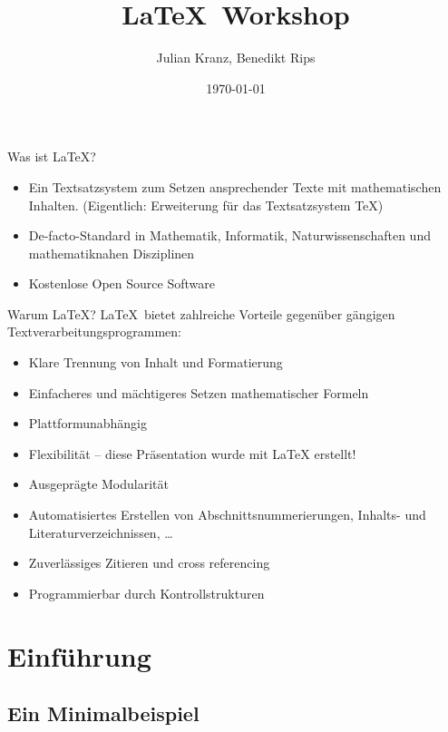 \documentclass[german]{f1rstlady/templates/presentation}
\title{\LaTeX\ Workshop}
\author{Julian Kranz, Benedikt Rips}
\institute[]{Learning Center}
\date{\today}
\begin{document}
\frame[plain]{\titlepage}


\AtBeginSection[]
{
    \begin{frame}
        \tableofcontents[currentsection, sectionstyle=show/shaded]
    \end{frame}
}

\begin{frame}{Was ist \LaTeX?}
\begin{itemize}
    \item Ein Textsatzsystem zum Setzen ansprechender Texte mit mathematischen Inhalten.
        (Eigentlich: Erweiterung für das Textsatzsystem TeX)
    \item De-facto-Standard in Mathematik, Informatik, Naturwissenschaften und mathematiknahen
        Disziplinen
    \item Kostenlose Open Source Software
\end{itemize}
\end{frame}

\begin{frame}{Warum \LaTeX?}
\LaTeX\ bietet zahlreiche Vorteile gegenüber gängigen Textverarbeitungsprogrammen:
\begin{itemize}
    \item Klare Trennung von Inhalt und Formatierung
    \item Einfacheres und mächtigeres Setzen mathematischer Formeln
    \item Plattformunabhängig
    \item Flexibilität – diese Präsentation wurde mit LaTeX erstellt!
    \item Ausgeprägte Modularität
    \item Automatisiertes Erstellen von Abschnittsnummerierungen, Inhalts- und
        Literaturverzeichnissen, \dots
    \item Zuverlässiges Zitieren und cross referencing
    \item Programmierbar durch Kontrollstrukturen
\end{itemize}
\end{frame}

\section{Einführung}

\subsection{Ein Minimalbeispiel}
\end{document}

